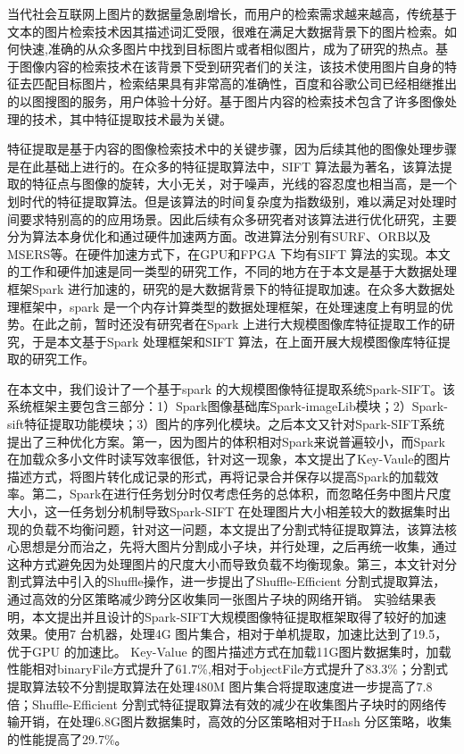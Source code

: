 ﻿\begin{cabstract}
当代社会互联网上图片的数据量急剧增长，而用户的检索需求越来越高，传统基于文本的图片检索技术因其描述词汇受限，很难在满足大数据背景下的图片检索。如何快速,准确的从众多图片中找到目标图片或者相似图片，成为了研究的热点。基于图像内容的检索技术在该背景下受到研究者们的关注，该技术使用图片自身的特征去匹配目标图片，检索结果具有非常高的准确性，百度和谷歌公司已经相继推出的以图搜图的服务，用户体验十分好。基于图片内容的检索技术包含了许多图像处理的技术，其中特征提取技术最为关键。

特征提取是基于内容的图像检索技术中的关键步骤，因为后续其他的图像处理步骤是在此基础上进行的。在众多的特征提取算法中，SIFT 算法最为著名，该算法提取的特征点与图像的旋转，大小无关，对于噪声，光线的容忍度也相当高，是一个划时代的特征提取算法。但是该算法的时间复杂度为指数级别，难以满足对处理时间要求特别高的的应用场景。因此后续有众多研究者对该算法进行优化研究，主要分为算法本身优化和通过硬件加速两方面。改进算法分别有SURF、ORB以及MSERS等。在硬件加速方式下，在GPU和FPGA 下均有SIFT 算法的实现。本文的工作和硬件加速是同一类型的研究工作，不同的地方在于本文是基于大数据处理框架Spark 进行加速的，研究的是大数据背景下的特征提取加速。在众多大数据处理框架中，spark 是一个内存计算类型的数据处理框架，在处理速度上有明显的优势。在此之前，暂时还没有研究者在Spark 上进行大规模图像库特征提取工作的研究，于是本文基于Spark 处理框架和SIFT 算法，在上面开展大规模图像库特征提取的研究工作。

在本文中，我们设计了一个基于spark 的大规模图像特征提取系统Spark-SIFT。该系统框架主要包含三部分：1）Spark图像基础库Spark-imageLib模块；2）Spark-sift特征提取功能模块；3）图片的序列化模块。之后本文又针对Spark-SIFT系统提出了三种优化方案。第一，因为图片的体积相对Spark来说普遍较小，而Spark在加载众多小文件时读写效率很低，针对这一现象，本文提出了Key-Vaule的图片描述方式，将图片转化成记录的形式，再将记录合并保存以提高Spark的加载效率。第二，Spark在进行任务划分时仅考虑任务的总体积，而忽略任务中图片尺度大小，这一任务划分机制导致Spark-SIFT 在处理图片大小相差较大的数据集时出现的负载不均衡问题，针对这一问题，本文提出了分割式特征提取算法，该算法核心思想是分而治之，先将大图片分割成小子块，并行处理，之后再统一收集，通过这种方式避免因为处理图片的尺度大小而导致负载不均衡现象。第三，本文针对分割式算法中引入的Shuffle操作，进一步提出了Shuffle-Efficient 分割式提取算法，通过高效的分区策略减少跨分区收集同一张图片子块的网络开销。 实验结果表明，本文提出并且设计的Spark-SIFT大规模图像特征提取框架取得了较好的加速效果。使用7 台机器，处理4G 图片集合，相对于单机提取，加速比达到了19.5，优于GPU 的加速比。 Key-Value 的图片描述方式在加载11G图片数据集时，加载性能相对binaryFile方式提升了61.7\%,相对于objectFile方式提升了83.3\%；分割式提取算法较不分割提取算法在处理480M 图片集合将提取速度进一步提高了7.8 倍；Shuffle-Efficient 分割式特征提取算法有效的减少在收集图片子块时的网络传输开销，在处理6.8G图片数据集时，高效的分区策略相对于Hash 分区策略，收集的性能提高了29.7\%。
\end{cabstract}

